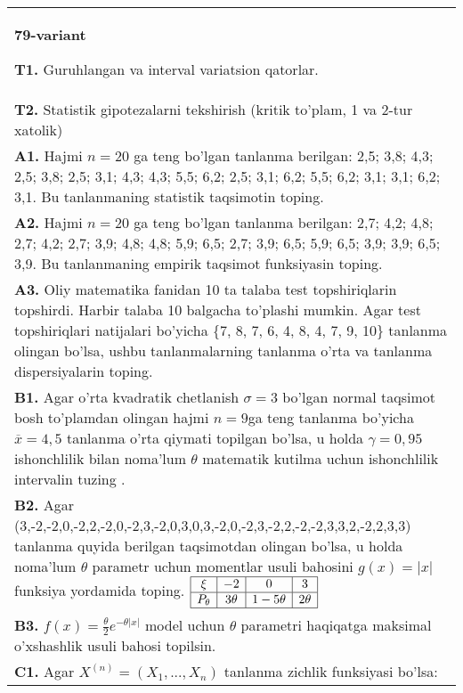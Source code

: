 \documentclass{article}
\begin{document}
\begin{tabular}{m{17cm}}
\textbf{79-variant}
\newline

\textbf{T1.} 
Guruhlangan va interval variatsion qatorlar.
\\
\textbf{T2.} 
Statistik gipotezalarni tekshirish (kritik to'plam, 1 va 2-tur xatolik)
\\
\textbf{A1.} 
Hajmi \(n = 20\) ga teng bo'lgan tanlanma berilgan: 2,5; 3,8; 4,3; 2,5; 3,8; 2,5; 3,1; 4,3; 4,3; 5,5; 6,2; 2,5; 3,1; 6,2; 5,5; 6,2; 3,1; 3,1; 6,2; 3,1. Bu tanlanmaning statistik taqsimotin toping.
\\
\textbf{A2.} 
Hajmi \(n = 20\) ga teng bo'lgan tanlanma berilgan: 2,7; 4,2; 4,8; 2,7; 4,2; 2,7; 3,9; 4,8; 4,8; 5,9; 6,5; 2,7; 3,9; 6,5; 5,9; 6,5; 3,9; 3,9; 6,5; 3,9. Bu tanlanmaning empirik taqsimot funksiyasin toping.
\\
\textbf{A3.} 
Oliy matematika fanidan 10 ta talaba test topshiriqlarin topshirdi. Harbir talaba 10 balgacha to'plashi mumkin. Agar test topshiriqlari natijalari bo'yicha \{7, 8, 7, 6, 4, 8, 4, 7, 9, 10\} tanlanma olingan bo'lsa, ushbu tanlanmalarning tanlanma o'rta va tanlanma dispersiyalarin toping.
\\
\textbf{B1.} 
Agar o'rta kvadratik chetlanish \(\sigma = 3\) bo'lgan normal taqsimot bosh to'plamdan olingan hajmi \(n = 9\)ga teng tanlanma bo'yicha \(\overline{x} = 4,5\) tanlanma o'rta qiymati topilgan bo'lsa, u holda \(\gamma = 0,95\) ishonchlilik bilan noma'lum \(\theta\) matematik kutilma uchun ishonchlilik intervalin tuzing .
\\
\textbf{B2.} 
Agar (3,-2,-2,0,-2,2,-2,0,-2,3,-2,0,3,0,3,-2,0,-2,3,-2,2,-2,-2,3,3,2,-2,2,3,3) tanlanma quyida berilgan taqsimotdan olingan bo'lsa, u holda noma'lum \(\theta\) parametr uchun momentlar usuli bahosini \(g(x) = |x|\) funksiya yordamida toping.
$\begin{array}{|c|c|c|c|}
    \hline
    \xi & -2 & 0 & 3 \\
    \hline
    P_{\theta} & 3\theta & 1 - 5\theta & 2\theta \\
    \hline
\end{array}$
\\
\textbf{B3.} 
\(f(x) = \frac{\theta}{2}e^{- \theta|x|}\) model uchun \(\theta\) parametri haqiqatga maksimal o'xshashlik usuli bahosi topilsin.
\\
\textbf{C1.} 
Agar \(X^{(n)} = \left( X_{1},...,X_{n} \right)\) tanlanma zichlik funksiyasi bo'lsa: \(f(x,\theta) = \left\{ \begin{matrix}

\end{matrix}
\end{tabular}
\end{document}
